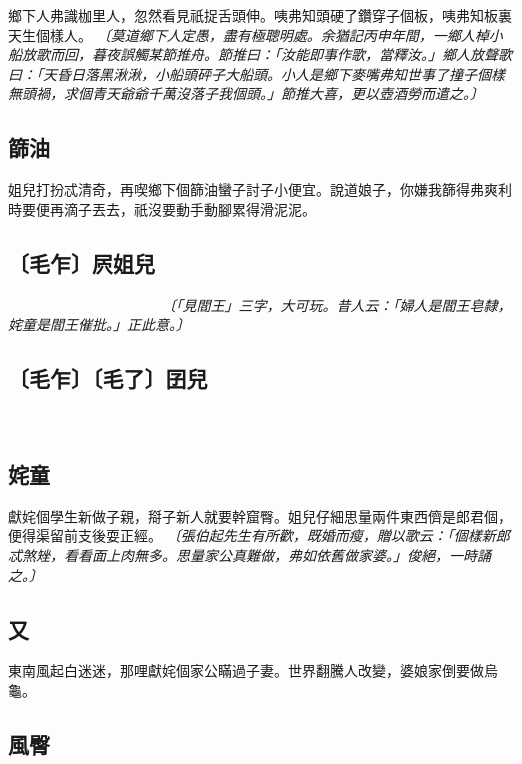 鄉下人弗識枷里人，忽然看見祇捉舌頭伸。咦弗知頭硬了鑽穿子個板，咦弗知板裏天生個樣人。
\textit{〔莫道鄉下人定愚，盡有極聰明處。余猶記丙申年間，一鄉人棹小船放歌而回，暮夜誤觸某節推舟。節推曰：「汝能即事作歌，當釋汝。」鄉人放聲歌曰：「天昏日落黑湫湫，小船頭砰子大船頭。小人是鄉下麥嘴弗知世事了撞子個樣無頭禍，求個青天爺爺千萬沒落子我個頭。」節推大喜，更以壺酒勞而遣之。〕}

\subsection*{篩油}

姐兒打扮忒清奇，再喫鄉下個篩油蠻子討子小便宜。說道娘子，你嫌我篩得弗爽利時要便再滴子丟去，祇沒要動手動腳累得滑泥泥。

\subsection*{〔毛乍〕屄姐兒}

𣬿屄匠人做子𣬿屄床，𣬿屄姐兒嫁子𣬿屄郎。𣬿折子床傍打地鋪，𣬿穿子地皮見閻王。
\textit{〔「見閻王」三字，大可玩。昔人云：「婦人是閻王皂隸，姹童是閻王催批。」正此意。〕}

\subsection*{〔毛乍〕〔毛了〕囝兒}

𣬿⿺毛了囡兒輪蜪行，娼個見子氣膨膨。雖然弗是大買賣，再喫個星小猢猻介一槍。

\subsection*{姹童}

獻姹個學生新做子親，搿子新人就要幹窟臀。姐兒仔細思量兩件東西儕是郎君個，便得渠留前支後耍正經。
\textit{〔張伯起先生有所歡，既婚而瘦，贈以歌云：「個樣新郎忒煞矬，看看面上肉無多。思量家公真難做，弗如依舊做家婆。」俊絕，一時誦之。〕}

\subsection*{又}

東南風起白迷迷，那哩獻姹個家公瞞過子妻。世界翻騰人改變，婆娘家倒要做烏龜。

\subsection*{風臀}

